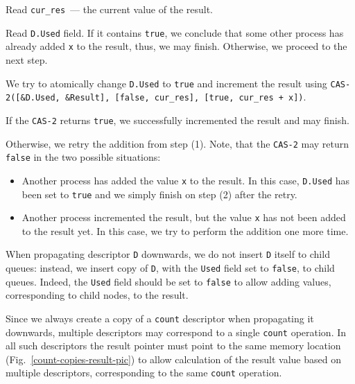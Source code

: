 \documentclass[times, dvipsnames,%
               languages={russian,english} %
              ]{itmo-student-thesis}
\begin{document}
\begin{nenum}
    \item Read \texttt{cur\_res}~--- the current value of the result.
    
    \item Read \texttt{D.Used} field. If it contains \texttt{true}, we conclude that some other process has already added \texttt{x} to the result, thus, we may finish. Otherwise, we proceed to the next step.
    
    \item We try to atomically change \texttt{D.Used} to \texttt{true} and increment the result using \texttt{CAS-2([\&D.Used, \&Result], [false, cur\_res], [true, cur\_res + x])}.
    
    \item If the \texttt{CAS-2} returns \texttt{true}, we successfully incremented the result and may finish.
    
    \item Otherwise, we retry the addition from step (1). Note, that the \texttt{CAS-2} may return \texttt{false} in the two possible situations:
    
    \begin{itemize}
        \item Another process has added the value \texttt{x} to the result. In this case, \texttt{D.Used} has been set to \texttt{true} and we simply finish on step (2) after the retry. 
        
        \item Another process incremented the result, but the value \texttt{x} has not been added to the result yet. In this case, we try to perform the addition one more time.
    \end{itemize}
\end{nenum}

\bigbreak

When propagating descriptor \texttt{D} downwards, we do not insert \texttt{D} itself to child queues: instead, we insert copy of \texttt{D}, with the \texttt{Used} field set to \texttt{false}, to child queues. Indeed, the \texttt{Used} field should be set to \texttt{false} to allow adding values, corresponding to child nodes, to the result. 

Since we always create a copy of a \texttt{count} descriptor when propagating it downwards, multiple descriptors may correspond to a single \texttt{count} operation. In all such descriptors the result pointer must point to the same memory location (Fig.~\ref{count-copies-result-pic}) to allow calculation of the result value based on multiple descriptors, corresponding to the same \texttt{count} operation.
\end{document}
